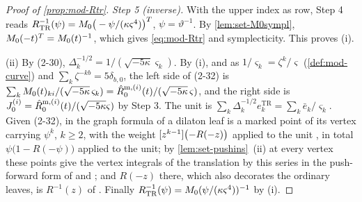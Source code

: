 \begin{proof}[Proof of \cref{prop:mod-Rtr}]
\emph{Step 5 (inverse).} With the upper index as row, Step 4 reads $R_{\mathrm{TR}}^{-1}(\psi)=M_{0}\big(-\psi/(\kappa\varsigma^4)\big)^T$, $\psi=\vartheta^{-1}$. By \cref{lem:set-M0sympl}, $M_{0}(-t)^T=M_{0}(t)^{-1}$, which gives \eqref{eq:mod-Rtr} and symplecticity. This proves (i).

(ii) By (2-30), $\Delta_k^{-1/2}=1/(\sqrt{-5\kappa}\varsigma_k)$. By (i), and as $1/\varsigma_k=\zeta^k/\varsigma$ (\cref{def:mod-curve}) and $\sum_k\zeta^{-kb}=5\delta_{b,0}$, the left side of (2-32) is $\sum_kM_{0}(t)_{ki}/(\sqrt{-5\kappa}\,\varsigma_k)=\hat{R}^{\mathrm m,(i)}_0(t)/(\sqrt{-5\kappa}\,\varsigma)$, and the right side is $J^{(i)}_0=\hat{R}^{\mathrm m,(i)}_0(t)/(\sqrt{-5\kappa}\varsigma)$ by Step 3. The unit is $\sum_k\Delta_k^{-1/2}e^{\mathrm{TR}}_k=\sum_k\bar e_k/\varsigma_k$. Given (2-32), in the graph formula of \cite[Thm.~4.1]{DuninBarkowski:2012bw} a dilaton leaf is a marked point of its vertex carrying $\psi^k$, $k\geq 2$, with the weight $[z^{k-1}]\bigl(-R(-z)\bigr)$ applied to the unit \cite[\S2.3]{DuninBarkowski:2012bw}, in total $\psi\bigl(1-R(-\psi)\bigr)$ applied to the unit; by \cref{lem:set-pushins}~(ii) at every vertex these points give the vertex integrals of the translation by this series in the push-forward form of \cite[Def.~2.5]{PPZ15} and \cite[\S2.3]{Dunin-Barkowski:2015caa}; and $R(-z)$ there, which also decorates the ordinary leaves, is $R^{-1}(z)$ of \cite[\S2.3]{Dunin-Barkowski:2015caa}. Finally $R_{\mathrm{TR}}^{-1}(\psi)=M_{0}(\psi/(\kappa\varsigma^4))^{-1}$ by (i).


\end{proof}
